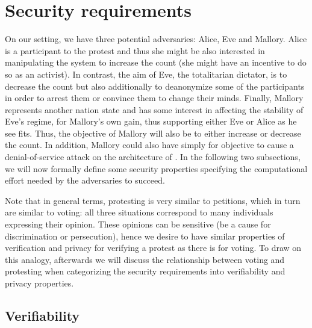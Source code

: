 \section{Security requirements}%
\label{Properties}


On our setting, we have three potential adversaries: Alice, Eve and Mallory.
Alice is a participant to the protest and thus she might be also interested in manipulating the system to increase the count (\eg she might have an incentive to do so as an activist).
In contrast, the aim of Eve, the totalitarian dictator, is to decrease the count but also additionally to deanonymize some of the participants in order to arrest them or convince them to change their minds.
Finally, Mallory represents another nation state and has some interest in affecting the stability of Eve's regime, for Mallory's own 
gain, thus supporting either Eve or Alice as he see fits.
Thus, the objective of Mallory will also be to either increase or decrease the count.
In addition, Mallory could also have simply for objective to cause a denial-of-service attack on the architecture of \PRIVO.
In the following two subsections, we will now formally define some security properties specifying the computational effort needed by the adversaries to succeed.

Note that in general terms, protesting is very similar to petitions, which in turn are similar to voting: all three situations correspond to many individuals expressing their opinion.
These opinions can be sensitive (\eg be a cause for discrimination or persecution), hence we desire to have similar properties of verification and privacy for verifying a protest as there is for voting. 
To draw on this analogy, afterwards we will discuss the relationship between voting and protesting when categorizing the security requirements into verifiability and privacy properties.

\subsection{Verifiability}%
\label{Verifiability}

